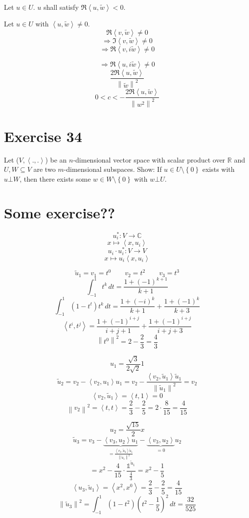 \documentclass[a4paper]{article}
\theoremstyle{definition}
\newcommand\set[1]{\left\{#1\right\}}
\newcommand\fun[1]{\left\langle{#1}\right\rangle}
\newcommand\norm[1]{\left\|{#1}\right\|}
\begin{document}
Let $u \in U$. $u$ shall satisfy $\Re\fun{u,\tilde{w}} < 0$.

Let $u \in U$ with $\fun{u,\tilde{w}} \neq 0$.
\[ \Re\fun{v, \tilde{w}} \neq 0 \]
\[ \Rightarrow \Im\fun{v,\tilde{w}} \neq 0 \]
\[ \Rightarrow \Re{\fun{v, i\tilde{w}}} \neq 0 \]

\[ \Rightarrow \Re{\fun{u, i\tilde{w}}} \neq 0 \]
\[ \frac{2\Re\fun{u,\tilde{w}}}{\norm{\tilde{w}}^2} \]
\[ 0 < c < -\frac{2\Re{\fun{u,\tilde{w}}}}{\norm{w^2}^2} \]


\section{Exercise 34}
\begin{ex}
  Let ($V, \fun{.,.}$) be an $n$-dimensional vector space with scalar product over $\mathbb R$ and
  $U, W \subseteq V$ are two $m$-dimensional subspaces. Show:
  If $u \in U \setminus \set{0}$ exists with $u \bot W$, then there exists some $w \in W \setminus \set{0}$
  with $w \bot U$.
\end{ex}


\section{Some exercise??}
\[ u_i^*: V \to \mathbb C \]
\[ x \mapsto \fun{x, u_i} \]
\[ u_i \cdot u_i^*: V \to V \]
\[ x \mapsto u_i \fun{x, u_i} \]

\[ \tilde{u}_1 = v_1 = t^0  \qquad v_2 = t^2 \qquad v_3 = t^3 \]
\[ \int_{-1}^1 t^k \, dt = \frac{1 + (-1)^{k+1}}{k+1} \]
\[ \int_{-1}^1 (1 - t^t) t^k \, dt = \frac{1 + (-i)^k}{k+1} + \frac{1 + (-1)^k}{k+3} \]
\[ \fun{t^i, t^j} = \frac{1 + (-1)^{i+j}}{i + j + 1} + \frac{1 + (-1)^{i+j}}{i + j + 3} \]
\[ \norm{t^0}^2 = 2 - \frac23 = \frac43 \]


\[ u_1 = \frac{\sqrt{3}}{2\sqrt{2}} 1 \]
\[ \tilde{u}_2 = v_2 - \fun{v_2, u_1} u_1 = v_2 - \frac{\fun{v_2, \tilde{u}_1} \tilde{u}_1}{\norm{\tilde{u}_1}^2} = v_2 \]
\[ \fun{v_2, \tilde{u}_1} = \fun{t, 1} = 0 \]
\[ \norm{v_2}^2 = \fun{t, t} = \frac23 - \frac25 = 2 \cdot \frac{8}{15} = \frac{4}{15} \]

\[ u_2 = \frac{\sqrt{15}}{2} x \]
\[ \tilde{u}_3 = v_3 - \underbrace{\fun{v_3, u_2} u_1}_{= \frac{\fun{v_3, \tilde{u}_2} \tilde{u}_1}{\norm{\tilde{u}_1}^2}} - \underbrace{\fun{v_3, u_2}}_{=0} u_2 \]
\[ = x^2 - \frac4{15} \cdot \frac{\mathbb 1^{\tilde{u}_1}}{\frac43} = x^2 - \frac15 \]
\[ \fun{u_3, \tilde{u}_1} = \fun{x^2, x^0} = \frac23 - \frac25 = \frac4{15} \]
\[ \norm{\tilde{u}_3}^2 = \int_{-1}^1 \left(1 - t^2\right) \left(t^2 - \frac15\right)^2 \, dt = \frac{32}{525} \]
\end{document}
